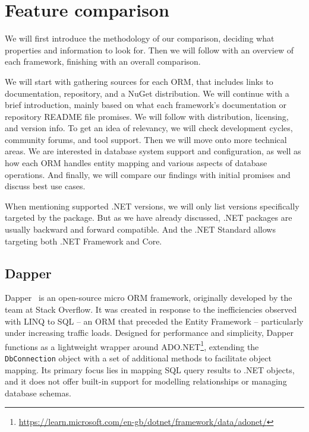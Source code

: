 \section{Feature comparison}
We will first introduce the methodology of our comparison, deciding what properties and information to look for. Then we will follow with an overview of each framework, finishing with an overall comparison.

We will start with gathering sources for each ORM, that includes links to documentation, repository, and a NuGet distribution. We will continue with a brief introduction, mainly based on what each framework's documentation or repository README file promises. We will follow with distribution, licensing, and version info. To get an idea of relevancy, we will check development cycles, community forums, and tool support. Then we will move onto more technical areas. We are interested in database system support and configuration, as well as how each ORM handles entity mapping and various aspects of database operations. And finally, we will compare our findings with initial promises and discuss best use cases.

When mentioning supported .NET versions, we will only list versions specifically targeted by the package. But as we have already discussed, .NET packages are usually backward and forward compatible. And the .NET Standard allows targeting both .NET Framework and Core.



\subsection{Dapper}\label{sec:feat_dapper}

Dapper~\cite{Dapper,DapperRepo} is an open-source micro ORM framework, originally developed by the team at Stack Overflow. It was created in response to the inefficiencies observed with LINQ to SQL -- an ORM that preceded the Entity Framework -- particularly under increasing traffic loads. Designed for performance and simplicity, Dapper functions as a lightweight wrapper around ADO.NET\footnote{\url{https://learn.microsoft.com/en-gb/dotnet/framework/data/adonet/}}, extending the \texttt{DbConnection} object with a set of additional methods to facilitate object mapping. Its primary focus lies in mapping SQL query results to .NET objects, and it does not offer built-in support for modelling relationships or managing database schemas.

